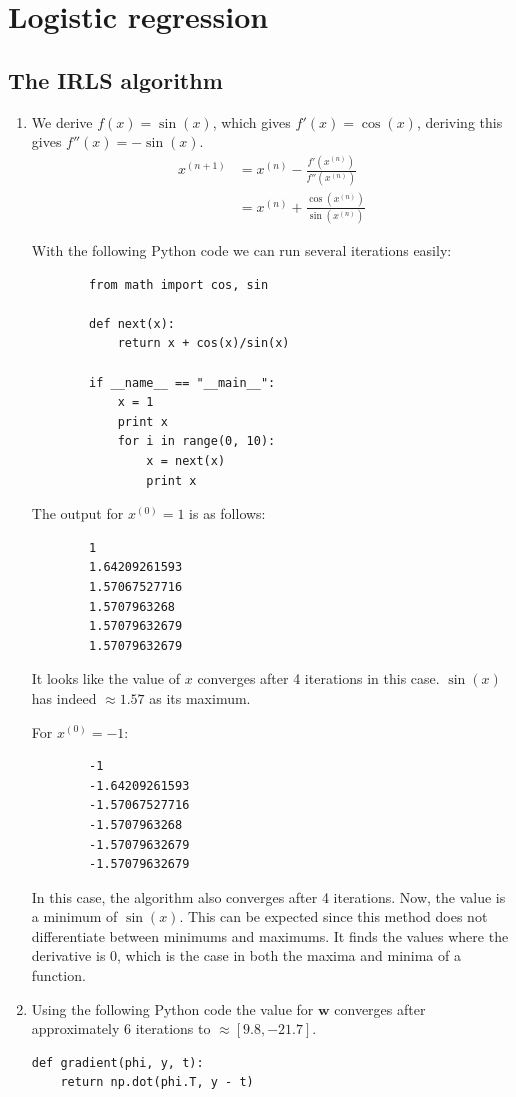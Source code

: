 \documentclass[paper=a4, fontsize=10pt]{scrartcl} %
\numberwithin{equation}{section} %
\numberwithin{figure}{section} %
\numberwithin{table}{section} %
\begin{document}
\section{Logistic regression}
\subsection{The IRLS algorithm}
\begin{enumerate}
	\item 
		We derive $f(x) = \sin(x)$, which gives $f'(x) = \cos(x)$, deriving this gives $f''(x) = -\sin(x)$.
		\begin{align}
			x^{(n+1)} &= x^{(n)} - \frac{f'(x^{(n)})}{f''(x^{(n)})}\\
			&= x^{(n)} + \frac{\cos(x^{(n)})}{\sin(x^{(n)})}
		\end{align}

		With the following Python code we can run several iterations easily:

		\begin{verbatim}
		from math import cos, sin

		def next(x):
		    return x + cos(x)/sin(x)

		if __name__ == "__main__":
		    x = 1
		    print x
		    for i in range(0, 10):
		        x = next(x)
		        print x
		\end{verbatim}

		The output for $x^{(0)} = 1$ is as follows:

		\begin{verbatim}
		1
		1.64209261593
		1.57067527716
		1.5707963268
		1.57079632679
		1.57079632679
		\end{verbatim}

		It looks like the value of $x$ converges after 4 iterations in this case. $\sin(x)$ has indeed $\approx 1.57$ as its maximum.

		For $x^{(0)} = -1$:

		\begin{verbatim}
		-1
		-1.64209261593
		-1.57067527716
		-1.5707963268
		-1.57079632679
		-1.57079632679
		\end{verbatim}

		In this case, the algorithm also converges after 4 iterations. Now, the value is a minimum of $\sin(x)$. This can be expected since this method does not differentiate between minimums and maximums. It finds the values where the derivative is 0, which is the case in both the maxima and minima of a function.
	\item
		Using the following Python code the value for $\boldsymbol w$ converges after approximately 6 iterations to $\approx [9.8, -21.7]$.
		\begin{verbatim}
def gradient(phi, y, t):
    return np.dot(phi.T, y - t)


\end{verbatim}
\end{enumerate}
\end{document}

